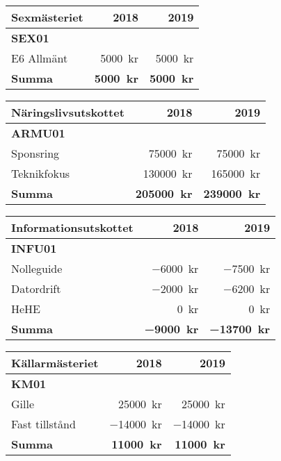 \documentclass[../_main/handlingar.tex]{subfiles}
\begin{document}
\begin{tabularx}{10cm}{X r r}
    \textbf{\large Sexmästeriet} & \textbf{2018} & \textbf{2019} \\
    \hline
    \textbf{SEX01} \\
    E6 Allmänt & \SI{5000}{kr} & \SI{5000}{kr} \\
    \hline
    \textbf{Summa} & \textbf{\SI{5000}{kr}} & \textbf{\SI{5000}{kr}} \\
\end{tabularx}

\begin{tabularx}{10cm}{X r r}
    \textbf{\large Näringslivsutskottet} & \textbf{2018} & \textbf{2019} \\
    \hline
    \textbf{ARMU01} \\
    Sponsring & \SI{75000}{kr} & \SI{75000}{kr} \\
    Teknikfokus & \SI{130000}{kr} & \SI{165000}{kr} \\
    \hline
    \textbf{Summa} & \textbf{\SI{205000}{kr}} & \textbf{\SI{239000}{kr}} \\
\end{tabularx}

\begin{tabularx}{10cm}{X r r}
    \textbf{\large Informationsutskottet} & \textbf{2018} & \textbf{2019} \\
    \hline
    \textbf{INFU01} \\
    Nolleguide & \SI{-6000}{kr} & \SI{-7500}{kr} \\
    Datordrift & \SI{-2000}{kr} & \SI{-6200}{kr} \\
    HeHE & \SI{0}{kr} & \SI{0}{kr} \\
    \hline
    \textbf{Summa} & \textbf{\SI{-9000}{kr}} & \textbf{\SI{-13700}{kr}} \\
\end{tabularx}

\begin{tabularx}{10cm}{X r r}
    \textbf{\large Källarmästeriet} & \textbf{2018} & \textbf{2019} \\
    \hline
    \textbf{KM01} \\
    Gille & \SI{25000}{kr} & \SI{25000}{kr} \\
    Fast tillstånd & \SI{-14000}{kr} & \SI{-14000}{kr} \\
    \hline
    \textbf{Summa} & \textbf{\SI{11000}{kr}} & \textbf{\SI{11000}{kr}} \\
\end{tabularx}
\end{document}
